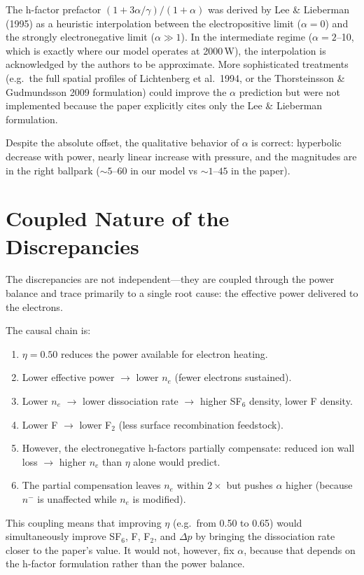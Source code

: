 \documentclass[11pt,a4paper]{article}
\begin{document}
The h-factor prefactor $(1 + 3\alpha/\gamma)/(1 + \alpha)$ was derived by Lee \& Lieberman (1995) as a heuristic interpolation between the electropositive limit ($\alpha = 0$) and the strongly electronegative limit ($\alpha \gg 1$). In the intermediate regime ($\alpha = 2$--10, which is exactly where our model operates at 2000\,W), the interpolation is acknowledged by the authors to be approximate. More sophisticated treatments (e.g.\ the full spatial profiles of Lichtenberg et al.\ 1994, or the Thorsteinsson \& Gudmundsson 2009 formulation) could improve the $\alpha$ prediction but were not implemented because the paper explicitly cites only the Lee \& Lieberman formulation.

Despite the absolute offset, the qualitative behavior of $\alpha$ is correct: hyperbolic decrease with power, nearly linear increase with pressure, and the magnitudes are in the right ballpark (${\sim}5$--$60$ in our model vs ${\sim}1$--$45$ in the paper).

\section{Coupled Nature of the Discrepancies}

The discrepancies are not independent---they are coupled through the power balance and trace primarily to a single root cause: the effective power delivered to the electrons.

The causal chain is:
\begin{enumerate}[nosep]
\item $\eta = 0.50$ reduces the power available for electron heating.
\item Lower effective power $\to$ lower $n_e$ (fewer electrons sustained).
\item Lower $n_e$ $\to$ lower dissociation rate $\to$ higher SF$_6$ density, lower F density.
\item Lower F $\to$ lower F$_2$ (less surface recombination feedstock).
\item However, the electronegative h-factors partially compensate: reduced ion wall loss $\to$ higher $n_e$ than $\eta$ alone would predict.
\item The partial compensation leaves $n_e$ within $2\times$ but pushes $\alpha$ higher (because $n^-$ is unaffected while $n_e$ is modified).
\end{enumerate}

This coupling means that improving $\eta$ (e.g.\ from 0.50 to 0.65) would simultaneously improve SF$_6$, F, F$_2$, and $\Delta p$ by bringing the dissociation rate closer to the paper's value. It would not, however, fix $\alpha$, because that depends on the h-factor formulation rather than the power balance.
\end{document}
